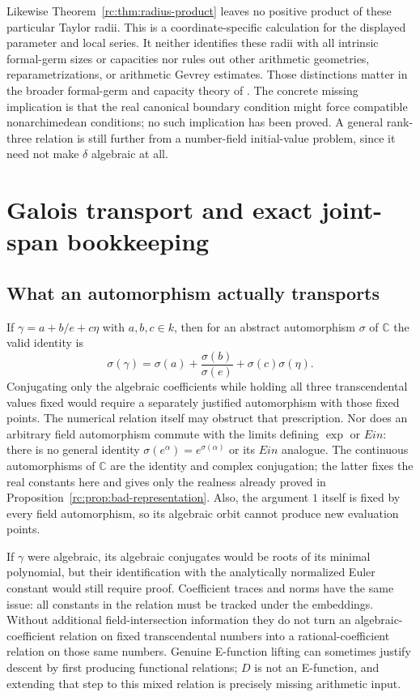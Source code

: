 \documentclass[11pt,a4paper]{article}
\theoremstyle{definition}
\theoremstyle{remark}
\theoremstyle{plain}
\numberwithin{equation}{section}
\def\operatorname#1{#1}\def\mathrm#1{#1}}
\providecommand{\rcEin}{\operatorname{Ein}}
\providecommand{\rcC}{\mathbb C}
\begin{document}
Likewise Theorem~\ref{rc:thm:radius-product} leaves no positive product
of these particular Taylor radii.  This is a coordinate-specific
calculation for the displayed parameter and local series.  It neither
identifies these radii with all intrinsic formal-germ sizes or capacities
nor rules out other arithmetic geometries, reparametrizations, or
arithmetic Gevrey estimates.  Those distinctions matter in the broader
formal-germ and capacity theory of \cite{rc:bost-chambert-loir}.
The concrete missing implication is that the real canonical boundary
condition might force compatible nonarchimedean conditions; no such
implication has been proved.  A general rank-three relation is still
further from a number-field initial-value problem, since it need not
make $\delta$ algebraic at all.

\section{Galois transport and exact joint-span bookkeeping}\label{rc:sec:galois}

\subsection{What an automorphism actually transports}

If $\gamma=a+b/e+c\eta$ with $a,b,c\in k$, then for an abstract
automorphism $\sigma$ of $\rcC$ the valid identity is
\begin{equation}\label{rc:eq:galois-transform}
 \sigma(\gamma)=\sigma(a)+\frac{\sigma(b)}{\sigma(e)}
                              +\sigma(c)\sigma(\eta).
\end{equation}
Conjugating only the algebraic coefficients while holding all three
transcendental values fixed would require a separately justified
automorphism with those fixed points.  The numerical relation itself
may obstruct that prescription.  Nor does an arbitrary field
automorphism commute with the limits defining $\exp$ or $\rcEin$:
there is no general identity
$\sigma(e^\alpha)=e^{\sigma(\alpha)}$ or its $\rcEin$ analogue.
The continuous automorphisms of $\rcC$ are the identity and complex
conjugation; the latter fixes the real constants here and gives only
the realness already proved in Proposition~\ref{rc:prop:bad-representation}.
Also, the argument $1$ itself is fixed by every field automorphism,
so its algebraic orbit cannot produce new evaluation points.

If $\gamma$ were algebraic, its algebraic conjugates would be roots of
its minimal polynomial, but their identification with the analytically
normalized Euler constant would still require proof.  Coefficient traces
and norms have the same issue: all constants in the relation must be
tracked under the embeddings.  Without additional field-intersection
information they do not turn an algebraic-coefficient relation on fixed
transcendental numbers into a rational-coefficient relation on those same
numbers.  Genuine E-function lifting can sometimes justify descent by
first producing functional relations; $D$ is not an E-function, and
extending that step to this mixed relation is precisely missing arithmetic
input.
\end{document}
